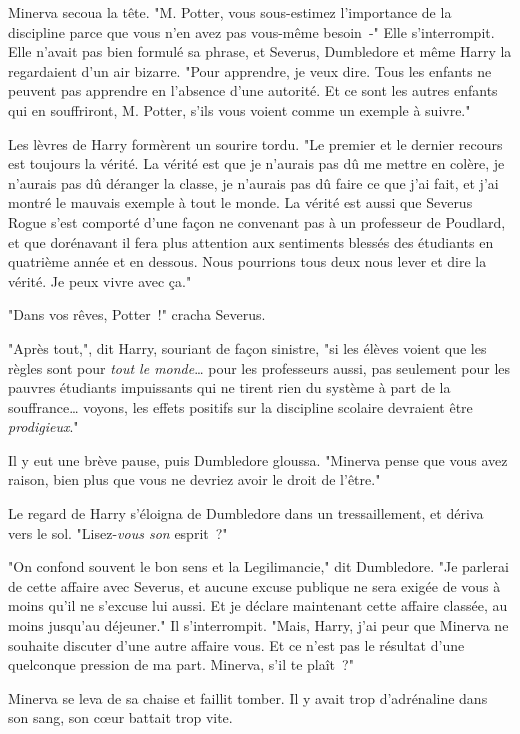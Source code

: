 Minerva secoua la tête. "M. Potter, vous sous-estimez l'importance de la discipline parce que vous n'en avez pas vous-même besoin~-" Elle s'interrompit. Elle n'avait pas bien formulé sa phrase, et Severus, Dumbledore et même Harry la regardaient d'un air bizarre. "Pour apprendre, je veux dire. Tous les enfants ne peuvent pas apprendre en l'absence d'une autorité. Et ce sont les autres enfants qui en souffriront, M. Potter, s'ils vous voient comme un exemple à suivre."

Les lèvres de Harry formèrent un sourire tordu. "Le premier et le dernier recours est toujours la vérité. La vérité est que je n'aurais pas dû me mettre en colère, je n'aurais pas dû déranger la classe, je n'aurais pas dû faire ce que j'ai fait, et j'ai montré le mauvais exemple à tout le monde. La vérité est aussi que Severus Rogue s'est comporté d'une façon ne convenant pas à un professeur de Poudlard, et que dorénavant il fera plus attention aux sentiments blessés des étudiants en quatrième année et en dessous. Nous pourrions tous deux nous lever et dire la vérité. Je peux vivre avec ça."

"Dans vos rêves, Potter~!" cracha Severus.

"Après tout,", dit Harry, souriant de façon sinistre, "si les élèves voient que les règles sont pour \emph{tout le monde}… pour les professeurs aussi, pas seulement pour les pauvres étudiants impuissants qui ne tirent rien du système à part de la souffrance… voyons, les effets positifs sur la discipline scolaire devraient être \emph{prodigieux}."

Il y eut une brève pause, puis Dumbledore gloussa. "Minerva pense que vous avez raison, bien plus que vous ne devriez avoir le droit de l'être."

Le regard de Harry s'éloigna de Dumbledore dans un tressaillement, et dériva vers le sol. "Lisez-\emph{vous son} esprit~?"

"On confond souvent le bon sens et la Legilimancie," dit Dumbledore. "Je parlerai de cette affaire avec Severus, et aucune excuse publique ne sera exigée de vous à moins qu'il ne s'excuse lui aussi. Et je déclare maintenant cette affaire classée, au moins jusqu'au déjeuner." Il s'interrompit. "Mais, Harry, j'ai peur que Minerva ne souhaite discuter d'une autre affaire vous. Et ce n'est pas le résultat d'une quelconque pression de ma part. Minerva, s'il te plaît~?"

Minerva se leva de sa chaise et faillit tomber. Il y avait trop d'adrénaline dans son sang, son cœur battait trop vite.

